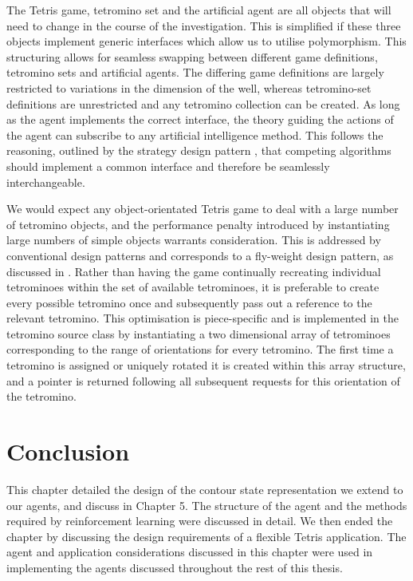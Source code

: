 \documentclass{rucsthesis}
\begin{document}
The Tetris game, tetromino set and the artificial agent are all objects that will need to change in the course of the investigation. This is simplified if these three objects implement generic interfaces which allow us to utilise polymorphism. This structuring allows for seamless swapping between different game definitions, tetromino sets and artificial agents. The differing game definitions are largely restricted to variations in the dimension of the well, whereas tetromino-set definitions are unrestricted and any tetromino collection can be created. As long as the agent implements the correct interface, the theory guiding the actions of the agent can subscribe to any artificial intelligence method. This follows the reasoning, outlined by the strategy design pattern \citep{designp}, that competing algorithms should implement a common interface and therefore be seamlessly interchangeable.

We would expect any object-orientated Tetris game to deal with a large number of tetromino objects, and the performance penalty introduced by instantiating large numbers of simple objects warrants consideration. This is addressed by conventional design patterns and corresponds to a fly-weight design pattern, as discussed in \cite{designp}. Rather than having the game continually recreating individual tetrominoes within the set of available tetrominoes, it is preferable to create every possible tetromino once and subsequently pass out a reference to the relevant tetromino. This optimisation is piece-specific and is implemented in the tetromino source class by instantiating a two dimensional array of tetrominoes corresponding to the range of orientations for every tetromino. The first time a tetromino is assigned or uniquely rotated it is created within this array structure, and a pointer is returned following all subsequent requests for this orientation of the tetromino.

\section{Conclusion}

This chapter detailed the design of the contour state representation we extend to our agents, and discuss in Chapter 5. The structure of the agent and the methods required by reinforcement learning were discussed in detail. We then ended the chapter by discussing the design requirements of a flexible Tetris application. The agent and application considerations discussed in this chapter were used in implementing the agents discussed throughout the rest of this thesis. 
\end{document}
